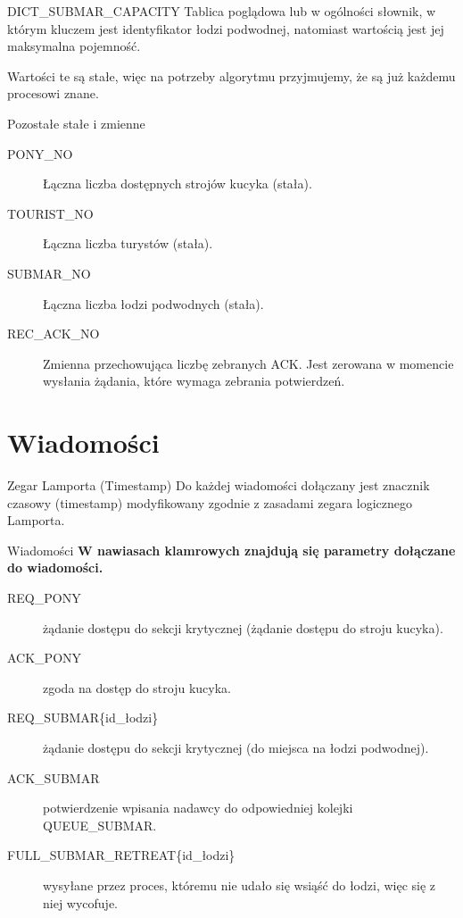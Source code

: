 \documentclass{beamer}
\begin{document}
\begin{frame}{DICT\_SUBMAR\_CAPACITY}
    \internallinenumbers
    \resetlinenumber[1]
    Tablica poglądowa lub w ogólności słownik, w którym kluczem jest identyfikator łodzi podwodnej, natomiast wartością jest jej maksymalna pojemność.

    \vspace{0.4cm}
    Wartości te są stałe, więc na potrzeby algorytmu przyjmujemy, że są już każdemu procesowi znane.
\end{frame}


\begin{frame}{Pozostałe stałe i zmienne}
    \internallinenumbers
    \resetlinenumber[1]
    \begin{description}
        \item [PONY\_NO] Łączna liczba dostępnych strojów kucyka (stała).
        \item [TOURIST\_NO] Łączna liczba turystów (stała).
        \item [SUBMAR\_NO] Łączna liczba łodzi podwodnych (stała).
        \item [REC\_ACK\_NO] Zmienna przechowująca liczbę zebranych ACK. Jest zerowana w momencie wysłania żądania, które wymaga zebrania potwierdzeń.
    \end{description}

\end{frame}

\section{Wiadomości}
\begin{frame}{Zegar Lamporta (Timestamp)}
    \internallinenumbers
    \resetlinenumber[1]
    Do każdej wiadomości dołączany jest znacznik czasowy (timestamp) modyfikowany zgodnie z zasadami zegara logicznego Lamporta.
\end{frame}

\begin{frame}{Wiadomości}
    \internallinenumbers
    \resetlinenumber[1]
    \textbf{W nawiasach klamrowych znajdują się parametry dołączane do wiadomości. }
    \begin{description}
        \item [REQ\_PONY] żądanie dostępu do sekcji krytycznej (żądanie dostępu do stroju kucyka).
        \item [ACK\_PONY] zgoda na dostęp do stroju kucyka.
        \item [REQ\_SUBMAR\{id\_łodzi\}] żądanie dostępu do sekcji krytycznej (do miejsca na łodzi podwodnej).
        \item [ACK\_SUBMAR] potwierdzenie wpisania nadawcy do odpowiedniej kolejki QUEUE\_SUBMAR.
        \item [FULL\_SUBMAR\_RETREAT\{id\_łodzi\}] wysyłane przez proces, któremu nie udało się wsiąść do łodzi, więc się z niej wycofuje.
    \end{description}
\end{frame}
\end{document}
